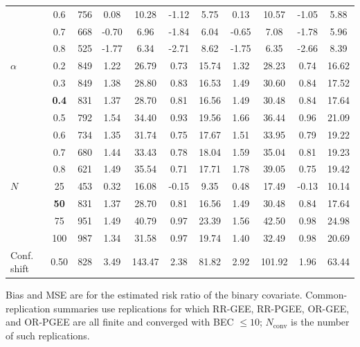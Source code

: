 \begin{table}[htbp]
\begin{tabular}{l c S[table-format=3.0] *{4}{S[table-format=-2.2] S[table-format=5.2]}}
 & 0.6 & 756 & 0.08 & 10.28 & -1.12 & 5.75 & 0.13 & 10.57 & -1.05 & 5.88 \\
 & 0.7 & 668 & -0.70 & 6.96 & -1.84 & 6.04 & -0.65 & 7.08 & -1.78 & 5.96 \\
 & 0.8 & 525 & -1.77 & 6.34 & -2.71 & 8.62 & -1.75 & 6.35 & -2.66 & 8.39 \\
\midrule
$\alpha$ & 0.2 & 849 & 1.22 & 26.79 & 0.73 & 15.74 & 1.32 & 28.23 & 0.74 & 16.62 \\
 & 0.3 & 849 & 1.38 & 28.80 & 0.83 & 16.53 & 1.49 & 30.60 & 0.84 & 17.52 \\
 & \textbf{0.4} & 831 & 1.37 & 28.70 & 0.81 & 16.56 & 1.49 & 30.48 & 0.84 & 17.64 \\
 & 0.5 & 792 & 1.54 & 34.40 & 0.93 & 19.56 & 1.66 & 36.44 & 0.96 & 21.09 \\
 & 0.6 & 734 & 1.35 & 31.74 & 0.75 & 17.67 & 1.51 & 33.95 & 0.79 & 19.22 \\
 & 0.7 & 680 & 1.44 & 33.43 & 0.78 & 18.04 & 1.59 & 35.04 & 0.81 & 19.23 \\
 & 0.8 & 621 & 1.49 & 35.54 & 0.71 & 17.71 & 1.78 & 39.05 & 0.75 & 19.42 \\
\midrule
$N$ & 25 & 453 & 0.32 & 16.08 & -0.15 & 9.35 & 0.48 & 17.49 & -0.13 & 10.14 \\
 & \textbf{50} & 831 & 1.37 & 28.70 & 0.81 & 16.56 & 1.49 & 30.48 & 0.84 & 17.64 \\
 & 75 & 951 & 1.49 & 40.79 & 0.97 & 23.39 & 1.56 & 42.50 & 0.98 & 24.98 \\
 & 100 & 987 & 1.34 & 31.58 & 0.97 & 19.74 & 1.40 & 32.49 & 0.98 & 20.69 \\
\midrule
Conf. shift & 0.50 & 828 & 3.49 & 143.47 & 2.38 & 81.82 & 2.92 & 101.92 & 1.96 & 63.44 \\
\bottomrule
\end{tabular}
\begin{flushleft}
\footnotesize Bias and MSE are for the estimated risk ratio of the binary covariate. Common-replication summaries use replications for which RR-GEE, RR-PGEE, OR-GEE, and OR-PGEE are all finite and converged with BEC $\leq 10$; $N_{\mathrm{conv}}$ is the number of such replications.
\end{flushleft}
\end{table}

